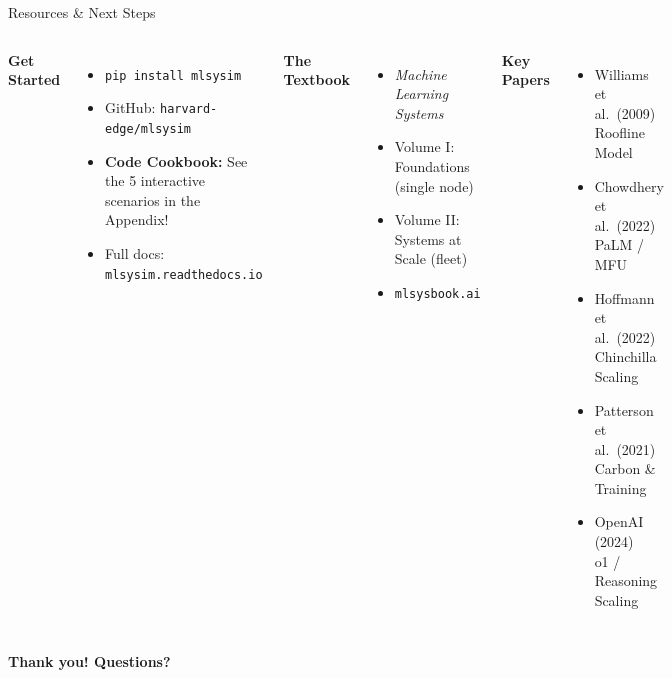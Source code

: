 \documentclass[aspectratio=169, 12pt]{beamer}
\begin{document}
\begin{frame}{Resources \& Next Steps}
\begin{columns}[T]
\textbf{Get Started}
\begin{itemize}
  \item \texttt{pip install mlsysim}
  \item GitHub: \texttt{harvard-edge/mlsysim}
  \item \textbf{Code Cookbook:} See the 5 interactive scenarios in the Appendix!
  \item Full docs: \texttt{mlsysim.readthedocs.io}
\end{itemize}

\vspace{0.5em}
\textbf{The Textbook}
\begin{itemize}
  \item \emph{Machine Learning Systems}
  \item Volume I: Foundations (single node)
  \item Volume II: Systems at Scale (fleet)
  \item \texttt{mlsysbook.ai}
\end{itemize}

\textbf{Key Papers}
\begin{itemize}
  \item Williams et al.\ (2009)\\
        {\footnotesize Roofline Model}
  \item Chowdhery et al.\ (2022)\\
        {\footnotesize PaLM / MFU}
  \item Hoffmann et al.\ (2022)\\
        {\footnotesize Chinchilla Scaling}
  \item Patterson et al.\ (2021)\\
        {\footnotesize Carbon \& Training}
  \item OpenAI (2024)\\
        {\footnotesize o1 / Reasoning Scaling}
\end{itemize}
\end{columns}

\vspace{1em}
\begin{center}
\Large\bfseries Thank you! Questions?
\end{center}
\end{frame}
\end{document}
